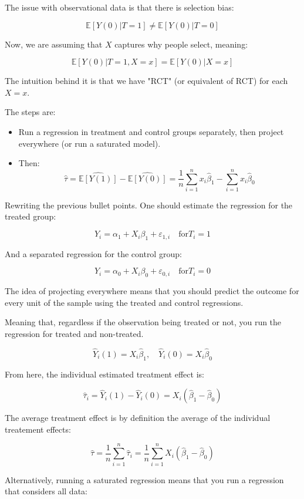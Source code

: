 \documentclass{article}
\begin{document}
The issue with observational data is that there is selection bias:

$$
\mathbb{E}[Y(0) | T=1] \neq \mathbb{E}[Y(0) | T=0]
$$

Now, we are assuming that $X$ captures why people select, meaning:

$$
\mathbb{E}[Y(0) | T=1, X = x] = \mathbb{E}[Y(0) | X = x]
$$

The intuition behind it is that we have "RCT" (or equivalent of RCT) for each $X = x$.

The steps are:
\begin{itemize}
    \item Run a regression in treatment and control groups separately, then project everywhere (or run a saturated model).
    \item Then:
    $$
    \hat{\tau} = \hat{\mathbb{E}[Y(1)]} - \hat{\mathbb{E}[Y(0)]} = \frac{1}{n} \sum_{i=1}^{n} x_i \hat{\beta}_1 - \sum_{i=1}^{n} x_i \hat{\beta}_0
    $$
\end{itemize}

Rewriting the previous bullet points. One should estimate the regression for the treated group:

$$
Y_i = \alpha_1 + X_i \beta_1 + \varepsilon_{1, i} \quad \text{for} T_i = 1
$$

And a separated regression for the control group:

$$
Y_i = \alpha_0 + X_i \beta_0 + \varepsilon_{0, i} \quad \text{for} T_i = 0
$$

The idea of projecting everywhere means that you should predict the outcome for every unit of the sample using the treated and control regressions.

Meaning that, regardless if the observation being treated or not, you run the regression for treated and non-treated.

$$
\hat{Y}_i(1) = X_i \hat{\beta}_1, \quad \hat{Y}_i(0) = X_i \hat{\beta}_0
$$

From here, the individual estimated treatment effect is:

$$
\hat{\tau}_i = \hat{Y}_i(1) - \hat{Y}_i(0) = X_i (\hat{\beta}_1 - \hat{\beta}_0)
$$

The average treatment effect is by definition the average of the individual treatement effects:

$$
\hat{\tau} = \frac{1}{n} \sum_{i = 1}^{n} \hat{\tau}_i = \frac{1}{n} \sum_{i = 1}^{n} X_i (\hat{\beta}_1 - \hat{\beta}_0)
$$

Alternatively, running a saturated regression means that you run a regression that considers all data:
\end{document}
